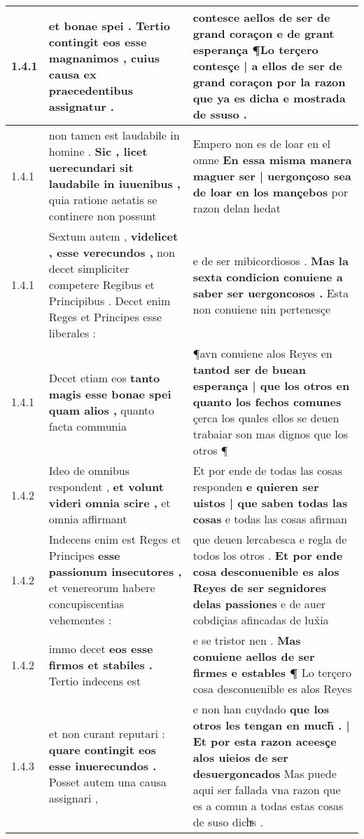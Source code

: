 \begin{tabular}{|p{1cm}|p{6.5cm}|p{6.5cm}|}
1.4.1 & et bonae spei . \textbf{ Tertio contingit eos esse magnanimos , } cuius causa ex praecedentibus assignatur . & contesce aellos de ser de grand coraçon e de grant esperança \textbf{ ¶Lo terçero contesçe | a ellos de ser de grand coraçon } por la razon que ya es dicha e mostrada de ssuso . \\\hline
1.4.1 & non tamen est laudabile in homine . \textbf{ Sic , licet uerecundari sit laudabile in iuuenibus , } quia ratione aetatis se continere non possunt & Empero non es de loar en el omne \textbf{ En essa misma manera maguer ser | uergonçoso sea de loar en los mançebos } por razon delan hedat \\\hline
1.4.1 & Sextum autem , \textbf{ videlicet , esse verecundos , } non decet simpliciter competere Regibus et Principibus . Decet enim Reges et Principes esse liberales : & e de ser mibicordiosos . \textbf{ Mas la sexta condicion conuiene a saber ser uergoncosos . } Esta non conuiene nin pertenesçe \\\hline
1.4.1 & Decet etiam eos \textbf{ tanto magis esse bonae spei quam alios , } quanto facta communia & ¶avn conuiene alos Reyes en \textbf{ tantod ser de buean esperança | que los otros en quanto los fechos comunes } çerca los quales ellos se deuen trabaiar son mas dignos que los otros ¶ \\\hline
1.4.2 & Ideo de omnibus respondent , \textbf{ et volunt videri omnia scire , } et omnia affirmant & Et por ende de todas las cosas responden \textbf{ e quieren ser uistos | que saben todas las cosas } e todas las cosas afirman \\\hline
1.4.2 & Indecens enim est Reges et Principes \textbf{ esse passionum insecutores , } et venereorum habere concupiscentias vehementes : & que deuen lercabesca e regla de todos los otros . \textbf{ Et por ende cosa desconuenible es alos Reyes de ser segnidores delas passiones } e de auer cobdiçias afincadas de lux̉ia \\\hline
1.4.2 & immo decet \textbf{ eos esse firmos et stabiles . } Tertio indecens est & e se tristor nen . \textbf{ Mas conuiene aellos de ser firmes e estables ¶ } Lo terçero cosa desconuenible es alos Reyes \\\hline
1.4.3 & et non curant reputari : \textbf{ quare contingit eos esse inuerecundos . } Posset autem una causa assignari , & e non han cuydado \textbf{ que los otros les tengan en much̃ . | Et por esta razon aceesçe alos uieios de ser desuergoncados } Mas puede aqui ser fallada vna razon que es a comun a todas estas cosas de suso dichͣs . \\\hline

\end{tabular}
